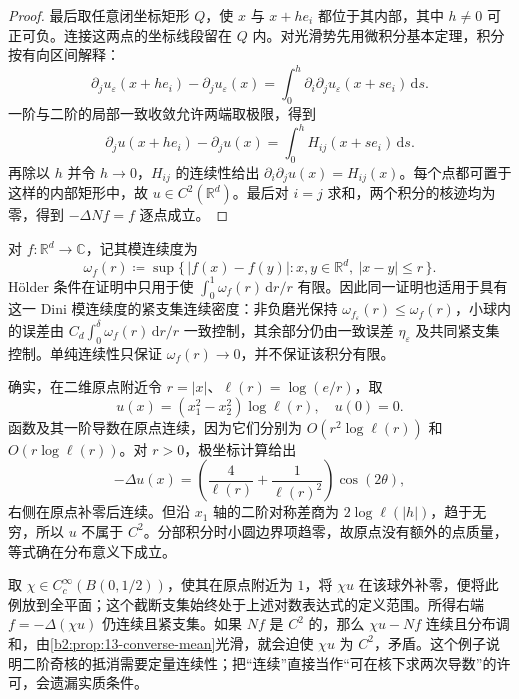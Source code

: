 \begin{proof}
最后取任意闭坐标矩形 \(Q\)，使 \(x\) 与 \(x+he_i\) 都位于其内部，其中 \(h\ne0\) 可正可负。连接这两点的坐标线段留在 \(Q\) 内。对光滑势先用微积分基本定理，积分按有向区间解释：
\[
 \partial_ju_\varepsilon(x+he_i)-\partial_ju_\varepsilon(x)
 =\int_0^h\partial_i\partial_ju_\varepsilon(x+se_i)\,\mathrm{d}s.
\]
一阶与二阶的局部一致收敛允许两端取极限，得到
\[
 \partial_ju(x+he_i)-\partial_ju(x)
 =\int_0^h H_{ij}(x+se_i)\,\mathrm{d}s.
\]
再除以 \(h\) 并令 \(h\to0\)，\(H_{ij}\) 的连续性给出 \(\partial_i\partial_ju(x)=H_{ij}(x)\)。每个点都可置于这样的内部矩形中，故 \(u\in C^2(\mathbb R^d)\)。最后对 \(i=j\) 求和，两个积分的核迹均为零，得到 \(-\Delta Nf=f\) 逐点成立。
\end{proof}

对 \(f:\mathbb R^d\to\mathbb C\)，记其模连续度为
\[
 \omega_f(r)\coloneqq\sup\{\,|f(x)-f(y)|:x,y\in\mathbb R^d,\ |x-y|\leq r\,\}.
\]
Hölder 条件在证明中只用于使 \(\int_0^1\omega_f(r)\,\mathrm{d}r/r\) 有限。因此同一证明也适用于具有这一 Dini 模连续度的紧支集连续密度：非负磨光保持 \(\omega_{f_\varepsilon}(r)\leq\omega_f(r)\)，小球内的误差由 \(C_d\int_0^\delta\omega_f(r)\,\mathrm{d}r/r\) 一致控制，其余部分仍由一致误差 \(\eta_\varepsilon\) 及共同紧支集控制。单纯连续性只保证 \(\omega_f(r)\to0\)，并不保证该积分有限。

\ProseParagraphBreak

确实，在二维原点附近令 \(r=|x|\)、\(\ell(r)=\log(e/r)\)，取
\[
 u(x)=(x_1^2-x_2^2)\log\ell(r),\quad u(0)=0.
\]
函数及其一阶导数在原点连续，因为它们分别为 \(O(r^2\log\ell(r))\) 和 \(O(r\log\ell(r))\)。对 \(r>0\)，极坐标计算给出
\[
 -\Delta u(x)=\left(\dfrac4{\ell(r)}+\dfrac1{\ell(r)^2}\right)\cos(2\theta),
\]
右侧在原点补零后连续。但沿 \(x_1\) 轴的二阶对称差商为 \(2\log\ell(|h|)\)，趋于无穷，所以 \(u\) 不属于 \(C^2\)。分部积分时小圆边界项趋零，故原点没有额外的点质量，等式确在分布意义下成立。

\ProseParagraphBreak

取 \(\chi\in C_c^\infty(B(0,1/2))\)，使其在原点附近为 \(1\)，将 \(\chi u\) 在该球外补零，便将此例放到全平面；这个截断支集始终处于上述对数表达式的定义范围。所得右端 \(f=-\Delta(\chi u)\) 仍连续且紧支集。如果 \(Nf\) 是 \(C^2\) 的，那么 \(\chi u-Nf\) 连续且分布调和，由\cref{b2:prop:13-converse-mean}光滑，就会迫使 \(\chi u\) 为 \(C^2\)，矛盾。这个例子说明二阶奇核的抵消需要定量连续性；把“连续”直接当作“可在核下求两次导数”的许可，会遗漏实质条件。
